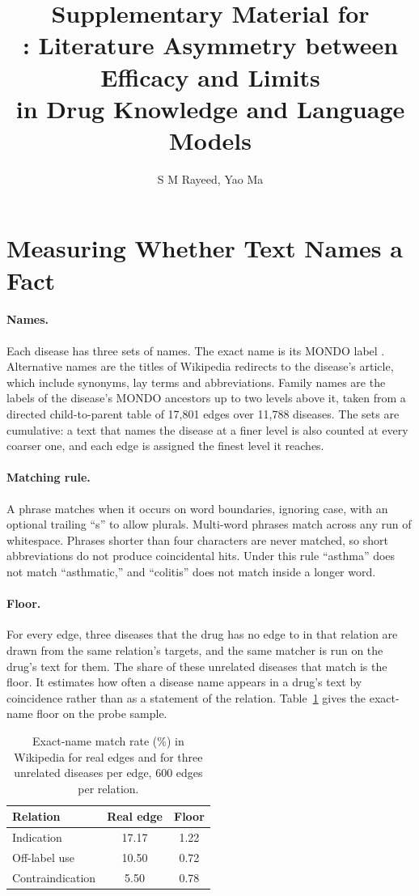 \documentclass[letterpaper]{article} %
\title{Supplementary Material for\\\lbl{}: Literature Asymmetry between Efficacy and Limits\\in Drug Knowledge and Language Models}
\author{S M Rayeed, Yao Ma}
\begin{document}
\maketitle

\section{Measuring Whether Text Names a Fact}

\paragraph{Names.}
Each disease has three sets of names. The exact name is its MONDO label
\citep{vasilevsky2022mondo}. Alternative names are the titles of Wikipedia
redirects to the disease's article, which include synonyms, lay terms and
abbreviations. Family names are the labels of the disease's MONDO ancestors up
to two levels above it, taken from a directed child-to-parent table of 17,801
edges over 11,788 diseases. The sets are cumulative: a text that names the
disease at a finer level is also counted at every coarser one, and each edge is
assigned the finest level it reaches.

\paragraph{Matching rule.}
A phrase matches when it occurs on word boundaries, ignoring case, with an
optional trailing ``s'' to allow plurals. Multi-word phrases match across any
run of whitespace. Phrases shorter than four characters are never matched, so
short abbreviations do not produce coincidental hits. Under this rule
``asthma'' does not match ``asthmatic,'' and ``colitis'' does not match inside
a longer word.

\paragraph{Floor.}
For every edge, three diseases that the drug has no edge to in that relation
are drawn from the same relation's targets, and the same matcher is run on the
drug's text for them. The share of these unrelated diseases that match is the
floor. It estimates how often a disease name appears in a drug's text by
coincidence rather than as a statement of the relation. Table~\ref{tab:floor}
gives the exact-name floor on the probe sample.

\begin{table}[h]
\centering
\small
\begin{tabular}{lcc}
\toprule
Relation & Real edge & Floor \\
\midrule
Indication & 17.17 & 1.22 \\
Off-label use & 10.50 & 0.72 \\
Contraindication & 5.50 & 0.78 \\
\bottomrule
\end{tabular}
\caption{Exact-name match rate (\%) in Wikipedia for real edges and for three
unrelated diseases per edge, 600 edges per relation.}
\label{tab:floor}
\end{table}
\end{document}
